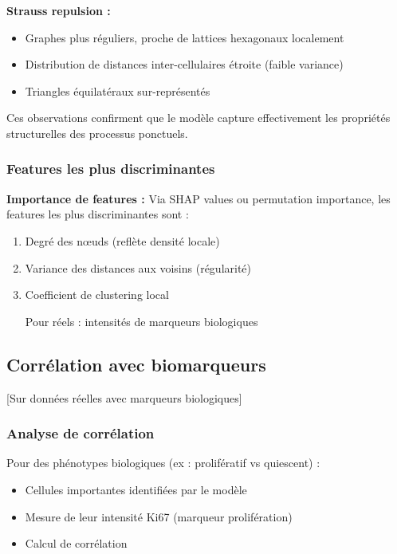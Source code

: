 \textbf{Strauss repulsion :}
\begin{itemize}
    \item Graphes plus réguliers, proche de lattices hexagonaux localement
    \item Distribution de distances inter-cellulaires étroite (faible variance)
    \item Triangles équilatéraux sur-représentés
\end{itemize}

Ces observations confirment que le modèle capture effectivement les propriétés structurelles des processus ponctuels.

\subsubsection{Features les plus discriminantes}

\textbf{Importance de features :}
Via SHAP values ou permutation importance, les features les plus discriminantes sont :
\begin{enumerate}
    \item Degré des nœuds (reflète densité locale)
    \item Variance des distances aux voisins (régularité)
    \item Coefficient de clustering local
    \item [Pour réels : intensités de marqueurs biologiques]
\end{enumerate}

\subsection{Corrélation avec biomarqueurs}

[Sur données réelles avec marqueurs biologiques]

\subsubsection{Analyse de corrélation}

Pour des phénotypes biologiques (ex : prolifératif vs quiescent) :
\begin{itemize}
    \item Cellules importantes identifiées par le modèle
    \item Mesure de leur intensité Ki67 (marqueur prolifération)
    \item Calcul de corrélation
\end{itemize}

